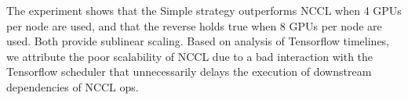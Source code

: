 The experiment shows that the Simple strategy outperforms NCCL when 4 GPUs per
node are used, and that the reverse holds true when 8 GPUs per node are
used. Both provide sublinear scaling. Based on analysis of Tensorflow timelines, 
we attribute the poor scalability of NCCL due to a bad interaction with the
Tensorflow scheduler that unnecessarily delays
the execution of downstream dependencies of NCCL ops.




